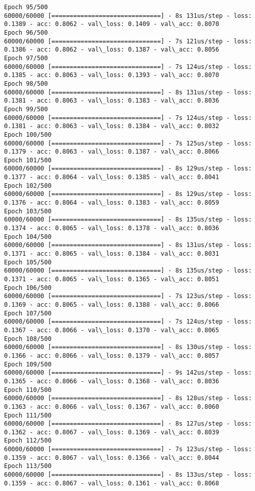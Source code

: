 \documentclass[11pt]{article}
\begin{document}
\begin{Verbatim}[commandchars=\\\{\}]
Epoch 95/500
60000/60000 [==============================] - 8s 131us/step - loss: 0.1389 - acc: 0.8062 - val\_loss: 0.1409 - val\_acc: 0.8070
Epoch 96/500
60000/60000 [==============================] - 7s 121us/step - loss: 0.1386 - acc: 0.8062 - val\_loss: 0.1387 - val\_acc: 0.8056
Epoch 97/500
60000/60000 [==============================] - 7s 124us/step - loss: 0.1385 - acc: 0.8063 - val\_loss: 0.1393 - val\_acc: 0.8070
Epoch 98/500
60000/60000 [==============================] - 8s 131us/step - loss: 0.1381 - acc: 0.8063 - val\_loss: 0.1383 - val\_acc: 0.8036
Epoch 99/500
60000/60000 [==============================] - 7s 124us/step - loss: 0.1381 - acc: 0.8063 - val\_loss: 0.1384 - val\_acc: 0.8032
Epoch 100/500
60000/60000 [==============================] - 7s 125us/step - loss: 0.1379 - acc: 0.8063 - val\_loss: 0.1387 - val\_acc: 0.8066
Epoch 101/500
60000/60000 [==============================] - 8s 129us/step - loss: 0.1377 - acc: 0.8064 - val\_loss: 0.1385 - val\_acc: 0.8041
Epoch 102/500
60000/60000 [==============================] - 8s 129us/step - loss: 0.1376 - acc: 0.8064 - val\_loss: 0.1383 - val\_acc: 0.8059
Epoch 103/500
60000/60000 [==============================] - 8s 135us/step - loss: 0.1374 - acc: 0.8065 - val\_loss: 0.1378 - val\_acc: 0.8036
Epoch 104/500
60000/60000 [==============================] - 8s 131us/step - loss: 0.1371 - acc: 0.8065 - val\_loss: 0.1384 - val\_acc: 0.8031
Epoch 105/500
60000/60000 [==============================] - 8s 135us/step - loss: 0.1371 - acc: 0.8065 - val\_loss: 0.1365 - val\_acc: 0.8051
Epoch 106/500
60000/60000 [==============================] - 7s 123us/step - loss: 0.1369 - acc: 0.8065 - val\_loss: 0.1388 - val\_acc: 0.8066
Epoch 107/500
60000/60000 [==============================] - 7s 124us/step - loss: 0.1367 - acc: 0.8066 - val\_loss: 0.1370 - val\_acc: 0.8065
Epoch 108/500
60000/60000 [==============================] - 8s 130us/step - loss: 0.1366 - acc: 0.8066 - val\_loss: 0.1379 - val\_acc: 0.8057
Epoch 109/500
60000/60000 [==============================] - 9s 142us/step - loss: 0.1365 - acc: 0.8066 - val\_loss: 0.1368 - val\_acc: 0.8036
Epoch 110/500
60000/60000 [==============================] - 8s 128us/step - loss: 0.1363 - acc: 0.8066 - val\_loss: 0.1367 - val\_acc: 0.8060
Epoch 111/500
60000/60000 [==============================] - 8s 127us/step - loss: 0.1362 - acc: 0.8067 - val\_loss: 0.1369 - val\_acc: 0.8039
Epoch 112/500
60000/60000 [==============================] - 7s 123us/step - loss: 0.1359 - acc: 0.8067 - val\_loss: 0.1366 - val\_acc: 0.8044
Epoch 113/500
60000/60000 [==============================] - 8s 133us/step - loss: 0.1359 - acc: 0.8067 - val\_loss: 0.1361 - val\_acc: 0.8068

\end{Verbatim}
\end{document}

